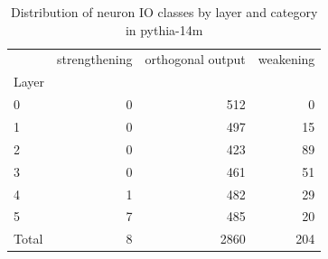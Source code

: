\begin{table}
\caption{Distribution of neuron IO classes by layer and category in pythia-14m}
\label{tab:pythia-14m}
\begin{tabular}{lrrr}
 & strengthening & orthogonal output & weakening \\
Layer &  &  &  \\
0 & 0 & 512 & 0 \\
1 & 0 & 497 & 15 \\
2 & 0 & 423 & 89 \\
3 & 0 & 461 & 51 \\
4 & 1 & 482 & 29 \\
5 & 7 & 485 & 20 \\
Total & 8 & 2860 & 204 \\
\end{tabular}
\end{table}
